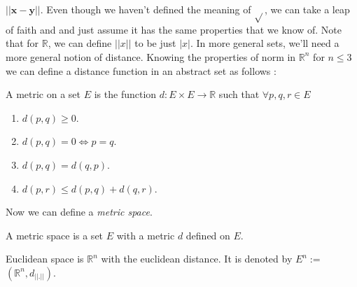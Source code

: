 $\lvert \lvert \mathbf{x} -\mathbf{y} \rvert \rvert$.
Even though we haven't defined the meaning of $\sqrt{}$, we can take a leap of faith and and just
assume it has the same properties that we know of. Note that for $\mathbb{R}$, we can define
$\lvert \lvert x \rvert \rvert$ to be just $\lvert x \rvert$. In more general sets, we'll need a 
more general notion of distance. Knowing the properties of norm in $\mathbb{R}^n $ for $ n \leq 3$
we can define a distance function in an abstract set as follows :
\begin{Definition}
    A metric on a set $E$ is the function $d : E \times E \rightarrow \mathbb{R}$ such that $\forall
    p,q,r \in E$
    \begin{enumerate}
	\item $d(p,q) \geq 0$.
	\item $d(p,q) = 0 \Leftrightarrow p = q$.
	\item $d(p,q) = d(q,p)$. 
	\item $d(p,r) \leq d(p,q) + d(q,r)$.
    \end{enumerate}
\end{Definition}
Now we can define a \emph{metric space}. 
\begin{Definition}
    A metric space is a set $E$ with a metric $d$ defined on $E$.
\end{Definition}
Euclidean space is $\mathbb{R}^n$ with the euclidean distance. It is denoted by 
$E^n :=$ $\left(\mathbb{R}^n, d_{\lvert \lvert . \rvert \rvert} \right)$.

